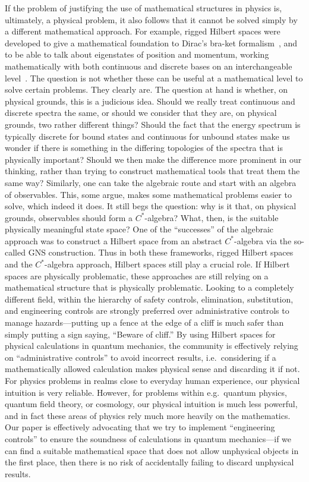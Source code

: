 \documentclass[10pt,twocolumn, nofootinbib]{revtex4-2}
\begin{document}
If the problem of justifying the use of mathematical structures in physics is, ultimately, a physical problem, it also follows that it cannot be solved simply by a different mathematical approach. For example, rigged Hilbert spaces were developed to give a mathematical foundation to Dirac’s bra-ket formalism~\cite{Dirac1947}, and to be able to talk about eigenstates of position and momentum, working mathematically with both continuous and discrete bases on an interchangeable level~\cite{Madrid_2005,Celeghini2016}. The question is not whether these can be useful at a mathematical level to solve certain problems. They clearly are. The question at hand is whether, on physical grounds, this is a judicious idea. Should we really treat continuous and discrete spectra the same, or should we consider that they are, on physical grounds, two rather different things? Should the fact that the energy spectrum is typically discrete for bound states and continuous for unbound states make us wonder if there is something in the differing topologies of the spectra that is physically important? Should we then make the difference more prominent in our thinking, rather than trying to construct mathematical tools that treat them the same way?  Similarly, one can take the algebraic route and start with an algebra of observables. This, some argue, makes some mathematical problems easier to solve, which indeed it does. It still begs the question: why is it that, on physical grounds, observables should form a $C^*$-algebra? What, then, is the suitable physically meaningful state space? One of the ``successes'' of the algebraic approach was to construct a Hilbert space from an abstract $C^*$-algebra via the so-called GNS construction. Thus in both these frameworks, rigged Hilbert spaces and the $C^*$-algebra approach, Hilbert spaces still play a crucial role. If Hilbert spaces are physically problematic, these approaches are still relying on a mathematical structure that is physically problematic.  Looking to a completely different field, within the hierarchy of safety controls, elimination, substitution, and engineering controls are strongly preferred over administrative controls to manage hazards---putting up a fence at the edge of a cliff is much safer than simply putting a sign saying, ``Beware of cliff.''  By using Hilbert spaces for physical calculations in quantum mechanics, the community is effectively relying on ``administrative controls'' to avoid incorrect results, i.e.~considering if a mathematically allowed calculation makes physical sense and discarding it if not.  For physics problems in realms close to everyday human experience, our physical intuition is very reliable.  However, for problems within e.g.~quantum physics, quantum field theory, or cosmology, our physical intuition is much less powerful, and in fact these areas of physics rely much more heavily on the mathematics.  Our paper is effectively advocating that we try to implement ``engineering controls'' to ensure the soundness of calculations in quantum mechanics---if we can find a suitable mathematical space that does not allow unphysical objects in the first place, then there is no risk of accidentally failing to discard unphysical results. 
\end{document}
